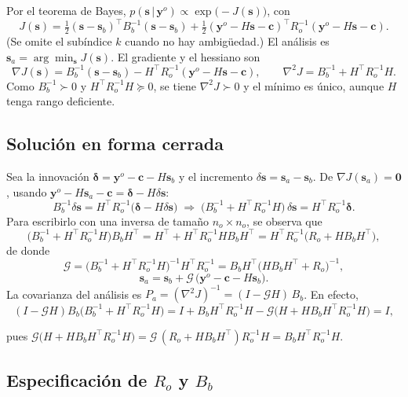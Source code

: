 Por el teorema de Bayes, $p(\mathbf s\,|\,\mathbf y^o)\propto\exp\!\big(-J(\mathbf s)\big)$, con
\[
J(\mathbf s)=\tfrac12(\mathbf s-\mathbf s_b)^\top B_b^{-1}(\mathbf s-\mathbf s_b)
+\tfrac12(\mathbf y^o-H\mathbf s-\mathbf c)^\top R_o^{-1}(\mathbf y^o-H\mathbf s-\mathbf c).
\]
(Se omite el subíndice $k$ cuando no hay ambigüedad.) El análisis es $\mathbf s_a=\arg\min_{\mathbf s}J(\mathbf s)$. 
El gradiente y el hessiano son
\[
\nabla J(\mathbf s)=B_b^{-1}(\mathbf s-\mathbf s_b)-H^\top R_o^{-1}(\mathbf y^o-H\mathbf s-\mathbf c),
\qquad
\nabla^2J=B_b^{-1}+H^\top R_o^{-1}H .
\]
Como $B_b^{-1}\succ0$ y $H^\top R_o^{-1}H\succeq0$, se tiene $\nabla^2J\succ0$ y el mínimo es único, aunque $H$ tenga rango
deficiente.

\subsection{Solución en forma cerrada}

Sea la innovación $\boldsymbol\delta=\mathbf y^o-\mathbf c-H\mathbf s_b$ y el incremento 
$\delta\mathbf s=\mathbf s_a-\mathbf s_b$. De $\nabla J(\mathbf s_a)=\mathbf 0$, 
usando $\mathbf y^o-H\mathbf s_a-\mathbf c=\boldsymbol\delta-H\delta\mathbf s$:
\[
B_b^{-1}\delta\mathbf s=H^\top R_o^{-1}\big(\boldsymbol\delta-H\delta\mathbf s\big)
\;\Longrightarrow\;
\big(B_b^{-1}+H^\top R_o^{-1}H\big)\,\delta\mathbf s=H^\top R_o^{-1}\boldsymbol\delta .
\]
Para escribirlo con una inversa de tamaño $n_o\times n_o$, se observa que
\[
\big(B_b^{-1}+H^\top R_o^{-1}H\big)B_bH^\top
=H^\top+H^\top R_o^{-1}HB_bH^\top
=H^\top R_o^{-1}\big(R_o+HB_bH^\top\big),
\]
de donde
\[
\mathcal G=\big(B_b^{-1}+H^\top R_o^{-1}H\big)^{-1}H^\top R_o^{-1}
=B_bH^\top\big(HB_bH^\top+R_o\big)^{-1},
\]
\begin{equation}\label{eq:analisis}
\mathbf s_a=\mathbf s_b+\mathcal G\,\big(\mathbf y^o-\mathbf c-H\mathbf s_b\big).
\end{equation}
La covarianza del análisis es $P_a=(\nabla^2J)^{-1}=(I-\mathcal GH)\,B_b$. En efecto,
\[
(I-\mathcal GH)B_b\big(B_b^{-1}+H^\top R_o^{-1}H\big)
=I+B_bH^\top R_o^{-1}H-\mathcal G\big(H+HB_bH^\top R_o^{-1}H\big)=I,
\]

pues $\mathcal G\big(H+HB_bH^\top R_o^{-1}H\big)=\mathcal G\,(R_o+HB_bH^\top)R_o^{-1}H=B_bH^\top R_o^{-1}H$.

\subsection{Especificación de $R_o$ y $B_b$}

